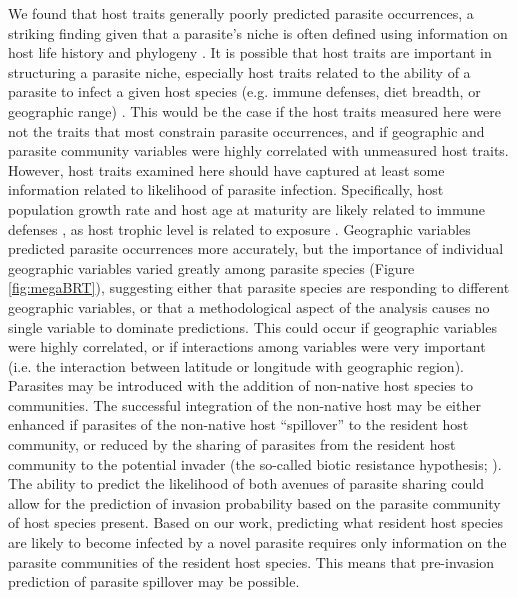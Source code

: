 \documentclass[12pt]{article}
\begin{document}
  
 We found that host traits generally poorly predicted parasite occurrences, a striking finding given that a parasite's niche is often defined using information on host life history and phylogeny \cite{strona2012, rohde1993}. It is possible that host traits are important in structuring a parasite niche, especially host traits related to the ability of a parasite to infect a given host species (e.g. immune defenses, diet breadth, or geographic range) \cite{johnson2012}. This would be the case if the host traits measured here were not the traits that most constrain parasite occurrences, and if geographic and parasite community variables were highly correlated with unmeasured host traits. However, host traits examined here should have captured at least some information related to likelihood of parasite infection. Specifically, host population growth rate and host age at maturity are likely related to immune defenses \cite{zuk2002}, as host trophic level is related to exposure \cite{price1990}. Geographic variables predicted parasite occurrences more accurately, but the importance of individual geographic variables varied greatly among parasite species (Figure \ref{fig:megaBRT}), suggesting either that parasite species are responding to different geographic variables, or that a methodological aspect of the analysis causes no single variable to dominate predictions. This could occur if geographic variables were highly correlated, or if interactions among variables were very important (i.e. the interaction between latitude or longitude with geographic region). \\
 
   
 Parasites may be introduced with the addition of non-native host species to communities. The successful integration of the non-native host may be either enhanced if parasites of the non-native host ``spillover'' to the resident host community, or reduced by the sharing of parasites from the resident host community to the potential invader (the so-called biotic resistance hypothesis; \cite{britton2013}). The ability to predict the likelihood of both avenues of parasite sharing could allow for the prediction of invasion probability based on the parasite community of host species present. Based on our work, predicting what resident host species are likely to become infected by a novel parasite requires only information on the parasite communities of the resident host species. This means that pre-invasion prediction of parasite spillover may be possible.  
 
  
  
\end{document}
